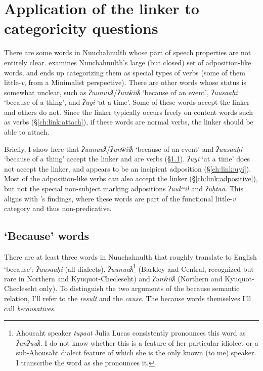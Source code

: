 \section{Application of the linker to categoricity questions} \label{ch:link:application}

There are some words in Nuuchahnulth whose part of speech properties are not entirely clear. \citet{woo2007b} examines Nuuchahnulth's large (but closed) set of adposition-like words, and ends up categorizing them as special types of verbs (some of them little-\textit{v}, from a Minimalist perspective). There are other words whose status is somewhat unclear, such as \textit{ʔuunuuƛ}/\textit{ʔunw̓iiƛ} `because of an event', \textit{ʔuusaaḥi} `because of a thing', and \textit{ʔuyi} `at a time'. Some of these words accept the linker and others do not. Since the linker typically occurs freely on content words such as verbs (\S\ref{ch:link:attach}), if these words are normal verbs, the linker should be able to attach.

Briefly, I show here that \textit{ʔuunuuƛ}/\textit{ʔunw̓iiƛ} `because of an event' and \textit{ʔuusaaḥi} `because of a thing' accept the linker and are verbs (\S\ref{ch:link:because}). \textit{ʔuyi} `at a time' does not accept the linker, and appears to be an incipient adposition (\S\ref{ch:link:uyi}). Most of the adposition-like verbs can also accept the linker (\S\ref{ch:link:adpositive}), but not the special non-subject marking adpositions \textit{ʔuukʷił} and \textit{ʔuḥtaa}. This aligns with \citeauthor{woo2007b}'s findings, where these words are part of the functional little-\textit{v} category and thus non-predicative.


\subsection{`Because' words} \label{ch:link:because}

There are at least three words in Nuuchahnulth that roughly translate to English `because': \textit{ʔuusaaḥi} (all dialects), \textit{ʔuunuuƛ}\footnote{Ahousaht speaker \textit{tupaat} Julia Lucas consistently pronounces this word as \textit{ʔunʔuuƛ}. I do not know whether this is a feature of her particular idiolect or a sub-Ahousaht dialect feature of which she is the only known (to me) speaker. I transcribe the word as she pronounces it.} (Barkley and Central, recognized but rare in Northern and Kyuquot-Checleseht) and \textit{ʔunw̓iiƛ} (Northern and Kyuquot-Checleseht only). To distinguish the two arguments of the because semantic relation, I'll refer to the \textit{result} and the \textit{cause}. The because words themselves I'll call \textit{becausatives}.

